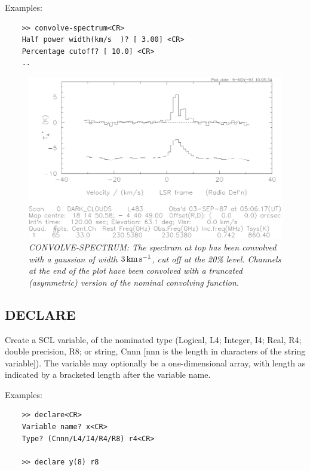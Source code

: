\documentclass[11pt,twoside]{report}
\newcommand{\kms}{{\rm\,km\,s^{-1}}}
\begin{document}
Examples:
\begin{verbatim}
    >> convolve-spectrum<CR>
    Half power width(km/s  )? [ 3.00] <CR>
    Percentage cutoff? [ 10.0] <CR>
    ..
\end{verbatim}

\begin{figure}[htbp]
\begin{center}
\includegraphics[scale=0.65]{convolve.ps}
\protect\parbox{5.5in}
{\caption[CONVOLVE]
{\sl
CONVOLVE-SPECTRUM: The spectrum at top has been convolved with a gaussian
of width $3\kms$, cut off at the 20\% level. Channels at the end of the 
plot have been convolved with a truncated (asymmetric) version of the 
nominal convolving function.
\label{CONVOLVE}
}
}
\end{center}
\end{figure}

\subsection{DECLARE}  

Create a SCL variable, of the nominated type (Logical, L4; Integer, I4;
Real, R4; double precision, R8; or string, Cnnn [nnn is the length in characters
of the string variable]). The variable may 
optionally be a one-dimensional array, with length as indicated by a
bracketed length after the variable name.

Examples:
\begin{verbatim}
    >> declare<CR>
    Variable name? x<CR>
    Type? (Cnnn/L4/I4/R4/R8) r4<CR>

    >> declare y(8) r8
\end{verbatim}
\end{document}
